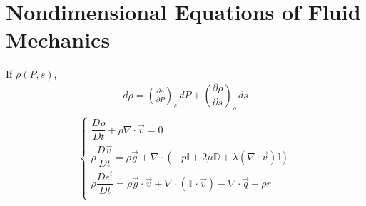 \documentclass[letterpaper,10pt,english]{jupyterBook}
\begin{document}
\sphinxstepscope


\chapter{Non\sphinxhyphen{}dimensional Equations of Fluid Mechanics}
\label{\detokenize{ch/fluids/dimensional-analysis:non-dimensional-equations-of-fluid-mechanics}}\label{\detokenize{ch/fluids/dimensional-analysis:fluid-mechanics-dimensional-analysis}}\label{\detokenize{ch/fluids/dimensional-analysis::doc}}
\sphinxAtStartPar
If \(\rho(P, s)\),
\begin{equation*}
\begin{split}d \rho = \left(\frac{\partial \rho}{\partial P}\right)_s \, d P + \left(\dfrac{\partial \rho}{\partial s} \right)_{\rho} \, ds\end{split}
\end{equation*}\begin{equation*}
\begin{split}\begin{cases}
  \dfrac{D \rho}{D t} + \rho \nabla \cdot \vec{v} = 0  \\
  \rho \dfrac{D \vec{v}}{D t} = \rho \vec{g} + \nabla \cdot \left(-p \mathbb{I} + 2 \mu \mathbb{D} + \lambda (\nabla \cdot \vec{v}) \mathbb{I} \right)  \\
  \rho \dfrac{D e^t    }{D t} = \rho \vec{g} \cdot \vec{v} + \nabla \cdot \left( \mathbb{T} \cdot \vec{v} \right) - \nabla \cdot \vec{q} + \rho r \\
\end{cases}\end{split}
\end{equation*}
\sphinxstepscope
\end{document}
